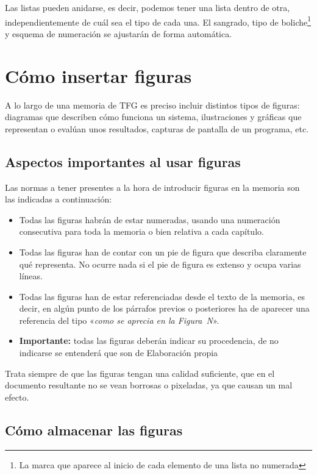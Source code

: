 Las listas pueden anidarse, es decir, podemos tener una lista dentro de otra, independientemente de cuál sea el tipo de cada una. El sangrado, tipo de boliche\footnote{La marca que aparece al inicio de cada elemento de una lista no numerada} y esquema de numeración se ajustarán de forma automática.

\section{Cómo insertar figuras}

A lo largo de una memoria de TFG es preciso incluir distintos tipos de figuras: diagramas que describen cómo funciona un sistema, ilustraciones y gráficas que representan o evalúan unos resultados, capturas de pantalla de un programa, etc.

\subsection{Aspectos importantes al usar figuras}

Las normas a tener presentes a la hora de introducir figuras en la memoria son las indicadas a continuación:

\begin{itemize}
    \item Todas las figuras habrán de estar numeradas, usando una numeración consecutiva para toda la memoria o bien relativa a cada capítulo.
    \item Todas las figuras han de contar con un pie de figura que describa claramente qué representa. No ocurre nada si el pie de figura es extenso y ocupa varias líneas.
    \item Todas las figuras han de estar referenciadas desde el texto de la memoria, es decir, en algún punto de los párrafos previos o posteriores ha de aparecer una referencia del tipo «\textit{como se aprecia en la Figura~N}».
    \item \textbf{Importante:} todas las figuras deberán indicar su procedencia, de no indicarse se entenderá que son de Elaboración propia
\end{itemize}

Trata siempre de que las figuras tengan una calidad suficiente, que en el documento resultante no se vean borrosas o pixeladas, ya que causan un mal efecto.

\subsection{Cómo almacenar las figuras}

